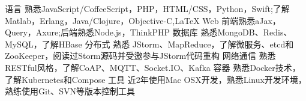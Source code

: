 


\begin{cvskills}


\cvskill
{语言} %
{熟悉JavaScript/CoffeeScript，PHP，HTML/CSS，Python，Swift;了解Matlab，Erlang，Java/Clojure，Objective-C,\LaTeX} %
\cvskill
{Web } %
{ 前端熟悉aJax，Query，Axure;后端熟悉Node.js，ThinkPHP} %
\cvskill
{数据库} %
{熟悉MongoDB、Redis、MySQL，了解HBase} %
\cvskill
{分布式} %
{ 熟悉 JStorm、MapReduce，了解微服务、etcd和ZooKeeper，阅读过Storm源码并受邀参与JStorm代码重构} %
\cvskill
{网络通信} %
{  熟悉RESTful风格，了解CoAP、MQTT、Socket.IO、Kafka} %
\cvskill
{容器 } %
{  熟悉Docker技术，了解Kubernetes和Compose} %
\cvskill
{工具 } %
{  近2年使用Mac OSX开发，熟悉Linux开发环境，熟练使用Git、SVN等版本控制工具} %

\end{cvskills}